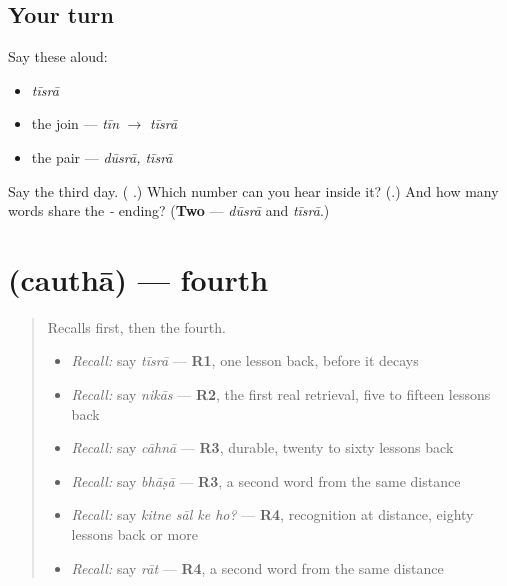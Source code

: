 \subsection*{Your turn}
Say these aloud:

\begin{itemize}
\raggedright
  \item \emph{tīsrā}
  \item the join — \emph{tīn} $\to$ \emph{tīsrā}
  \item the pair — \emph{dūsrā, tīsrā}
\end{itemize}

\begin{tcolorbox}[breakable,colback=teal!4,colframe=teal!35!black,title={Before you move on}]
Say the third day. (\textbf{ }.) Which number can you hear inside it? (\textbf{}.) And how many words share the \emph{-} ending? (\textbf{Two} — \emph{dūsrā} and \emph{tīsrā}.)
\end{tcolorbox}
\section[\texorpdfstring{\hi{चौथा} / \hi{चौथी} (cauthā / cauthī)}{चौथा / चौथी (cauthā / cauthī)}]{ (cauthā) — fourth}

\label{lesson:HI-C75-fourth}



\begin{quote}
Recalls first, then the fourth.

\begin{itemize}
\raggedright
  \item \emph{Recall:} say \emph{tīsrā} — \textbf{R1}, one lesson back, before it decays
  \item \emph{Recall:} say \emph{nikās} — \textbf{R2}, the first real retrieval, five to fifteen lessons back
  \item \emph{Recall:} say \emph{cāhnā} — \textbf{R3}, durable, twenty to sixty lessons back
  \item \emph{Recall:} say \emph{bhāṣā} — \textbf{R3}, a second word from the same distance
  \item \emph{Recall:} say \emph{kitne sāl ke ho?} — \textbf{R4}, recognition at distance, eighty lessons back or more
  \item \emph{Recall:} say \emph{rāt} — \textbf{R4}, a second word from the same distance
\end{itemize}
\end{quote}

